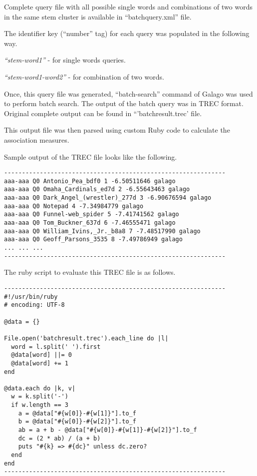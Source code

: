 \documentclass[letterpaper,12pt]{article}
\begin{document}
Complete query file with all possible single words and combinations of two words in the same stem cluster is available in ``batchquery.xml'' file.

The identifier key (``number'' tag) for each query was populated in the following way.

\emph{``stem-word1''} - for single words queries.

\emph{``stem-word1-word2''} - for combination of two words.

Once, this query file was generated, ``batch-search'' command of Galago was used to perform batch search. The output of the batch query was in TREC format. Original complete output can be found in ``'batchresult.trec' file.

This output file was then parsed using custom Ruby code to calculate the association measures.

Sample output of the TREC file looks like the following.

\begin{verbatim}
--------------------------------------------------------------
aaa-aaa Q0 Antonio_Pea_bdf0 1 -6.50511646 galago
aaa-aaa Q0 Omaha_Cardinals_ed7d 2 -6.55643463 galago
aaa-aaa Q0 Dark_Angel_(wrestler)_277d 3 -6.90676594 galago
aaa-aaa Q0 Notepad 4 -7.34984779 galago
aaa-aaa Q0 Funnel-web_spider 5 -7.41741562 galago
aaa-aaa Q0 Tom_Buckner_637d 6 -7.46555471 galago
aaa-aaa Q0 William_Ivins,_Jr._b8a8 7 -7.48517990 galago
aaa-aaa Q0 Geoff_Parsons_3535 8 -7.49786949 galago
... ... ...
--------------------------------------------------------------
\end{verbatim}

The ruby script to evaluate this TREC file is as follows.

\begin{verbatim}
--------------------------------------------------------------
#!/usr/bin/ruby
# encoding: UTF-8

@data = {}

File.open('batchresult.trec').each_line do |l|
  word = l.split(' ').first
  @data[word] ||= 0
  @data[word] += 1
end

@data.each do |k, v|
  w = k.split('-')
  if w.length == 3
    a = @data["#{w[0]}-#{w[1]}"].to_f
    b = @data["#{w[0]}-#{w[2]}"].to_f
    ab = a + b - @data["#{w[0]}-#{w[1]}-#{w[2]}"].to_f
    dc = (2 * ab) / (a + b)
    puts "#{k} => #{dc}" unless dc.zero?
  end
end
--------------------------------------------------------------
\end{verbatim}
\end{document}

